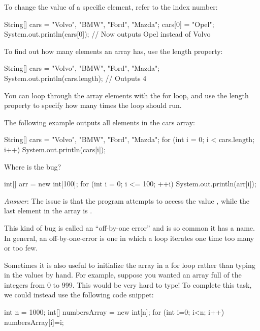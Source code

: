 To change the value of a specific element, refer to the index number:

\begin{code}
String[] cars = {"Volvo", "BMW", "Ford", "Mazda"};
cars[0] = "Opel";
System.out.println(cars[0]);
// Now outputs Opel instead of Volvo
\end{code}

To find out how many elements an array has, use the length property:

\begin{code}
String[] cars = {"Volvo", "BMW", "Ford", "Mazda"};
System.out.println(cars.length);
// Outputs 4
\end{code}

You can loop through the array elements with the for loop, and use the length property to specify how many times the loop should run.

The following example outputs all elements in the cars array:

\begin{code}
String[] cars = {"Volvo", "BMW", "Ford", "Mazda"};
for (int i = 0; i < cars.length; i++) {
  System.out.println(cars[i]);
}
\end{code}

\begin{example}Where is the bug?
\begin{code}
int[] arr = new int[100]; 
for (int i = 0; i <= 100; ++i) {
    System.out.println(arr[i]);
}
\end{code}
\noindent \emph{Answer}:
The issue is that the program attempts to access the value , while the last element in the array is .

This kind of bug is called an ``off-by-one error'' and is so common it has a name. In general, an off-by-one-error is one in which a loop iterates one time too many or too few.

\end{example}

Sometimes it is also useful to initialize the array in a for loop rather than typing in the values by hand. For example, suppose you wanted an array full of the integers from 0 to 999. This would be very hard to type! To complete this task, we could instead use the following code snippet:

\begin{code}
int n = 1000;
int[] numbersArray = new int[n];
for (int i=0; i<n; i++) {
  numbersArray[i]=i;
}
\end{code}

